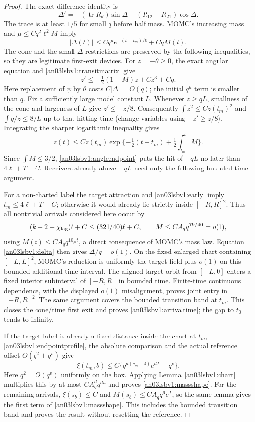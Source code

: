 \documentclass[11pt]{article}
\theoremstyle{remark}\newtheorem{remark}[theorem]{Remark}
\begin{document}
\begin{proof}
The exact difference identity is
\[
 \Delta'=-(\operatorname{tr}R_\theta)\sin\Delta
                 +(R_{12}-R_{21})\cos\Delta.
\]
The trace is at least $1/5$ for small $q$ before half mass.
MOMC's increasing mass and $\mu\le Cq^2\ell^2M$ imply
\begin{equation}
 |\Delta(t)|\le Cq^u e^{-(t-t_m)/6}+CqM(t).
 \label{an03lsbv1:delta}
\end{equation}
The cone and the small-$\Delta$ restrictions are preserved by the
following inequalities, so they are legitimate first-exit devices.
For $z=-\theta\ge0$, the exact angular equation and
\eqref{an03lsbv1:transitmatrix} give
\[
 z'\le-\tfrac12(1-M)z+Cz^3+Cq.
\]
Here replacement of $\psi$ by $\theta$ costs $C|\Delta|=O(q)$;
the initial $q^u$ term is smaller than $q$.
Fix a sufficiently large model constant $L$. Whenever $z\ge qL$,
smallness of the cone and largeness of $L$ give $z'\le-z/8$.
Consequently $\int z^2\le C z(t_m)^2$ and
$\int q/z\le8/L$ up to that hitting time (change variables using
$-z'\ge z/8$). Integrating the sharper logarithmic inequality gives
\[
 z(t)\le C z(t_m)\exp\{-\tfrac12(t-t_m)+\tfrac12\int_{t_m}^tM\}.
\]
Since $\int M\le3/2$, \eqref{an03lsbv1:angleendpoint} puts the hit
of $-qL$ no later than $4\ell+T+C$. Receivers already above $-qL$
need only the following bounded-time argument.

For a non-charted label the target attraction and
\eqref{an03lsbv1:early} imply $t_m\le4\ell+T+C$; otherwise it
would already lie strictly inside $[-R,R]^2$. Thus all nontrivial
arrivals considered here occur by
\[
 (k+2+\chi_{\rm lag})\ell+C\le(321/40)\ell+C,
 \qquad M\le C A_q q^{79/40}=o(1),
\]
using $M(t)\le C A_q q^{10}e^t$, a direct consequence of MOMC's
mass law. Equation \eqref{an03lsbv1:delta} then gives
$\Delta/q=o(1)$. On the fixed enlarged chart containing
$[-L,L]^2$, MOMC's reduction is uniformly the target field plus
$o(1)$ on this bounded additional time interval. The aligned target
orbit from $[-L,0]$ enters a fixed interior subinterval of $[-R,R]$
in bounded time. Finite-time continuous dependence, with the
displayed $o(1)$ misalignment, proves joint entry in $[-R,R]^2$.
The same argument covers the bounded transition band at $t_m$.
This closes the cone/time first exit and proves
\eqref{an03lsbv1:arrivaltime}; the gap to $t_0$ tends to infinity.

If the target label is already a fixed distance inside the chart at
$t_m$, \eqref{an03lsbv1:endpointprofile}, the absolute comparison
and the actual reference offset $O(q^2+q^v)$ give
\[
 \xi(t_m,b)\le C\{q^{d(c_m-4)}e^{dT}+q^v\}.
\]
Here $q^2=O(q^v)$ uniformly on the box. Applying
Lemma~\ref{an03lsbv1:chart} multiplies this by at most
$C A_q^d q^{du}$ and proves \eqref{an03lsbv1:massshape}.
For the remaining arrivals, $\xi(s_b)\le C$ and
$M(s_b)\le C A_q q^6e^T$, so the same lemma gives the first
term of \eqref{an03lsbv1:massshape}. This includes the bounded
transition band and proves the result without resetting the reference.
\end{proof}
\end{document}
